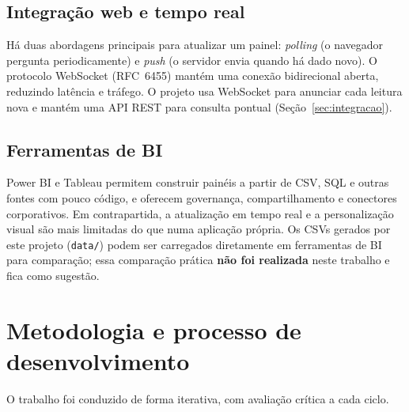 \documentclass[12pt,a4paper]{article}
\newcommand{\codigo}[1]{\texttt{\small #1}}
\begin{document}
\subsection{Integração web e tempo real}
Há duas abordagens principais para atualizar um painel: \emph{polling} (o navegador pergunta periodicamente) e \emph{push} (o servidor envia quando há dado novo).
O protocolo WebSocket (RFC~6455) mantém uma conexão bidirecional aberta, reduzindo latência e tráfego. O projeto usa WebSocket para anunciar cada
leitura nova e mantém uma API REST para consulta pontual (Seção~\ref{sec:integracao}).

\subsection{Ferramentas de BI}
Power BI e Tableau permitem construir painéis a partir de CSV, SQL e outras fontes com pouco código, e oferecem governança, compartilhamento e conectores
corporativos. Em contrapartida, a atualização em tempo real e a personalização visual são mais limitadas do que numa aplicação própria. Os CSVs gerados
por este projeto (\codigo{data/}) podem ser carregados diretamente em ferramentas de BI para comparação; essa comparação prática \textbf{não foi realizada}
neste trabalho e fica como sugestão.

\section{Metodologia e processo de desenvolvimento}
O trabalho foi conduzido de forma iterativa, com avaliação crítica a cada ciclo.
\end{document}
